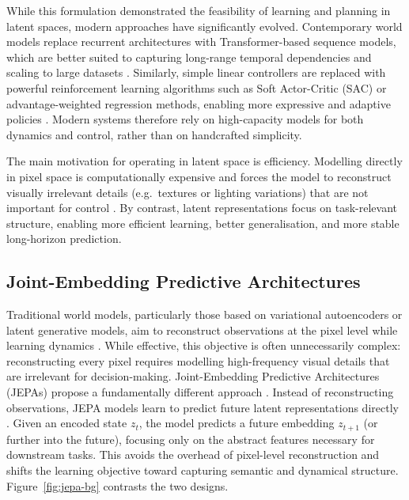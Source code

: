 While this formulation demonstrated the feasibility of learning and planning in latent spaces, modern approaches have significantly evolved. Contemporary world models replace recurrent architectures with Transformer-based sequence models, which are better suited to capturing long-range temporal dependencies and scaling to large datasets \cite{hafner2025dreamerv4}. Similarly, simple linear controllers are replaced with powerful reinforcement learning algorithms such as Soft Actor-Critic (SAC) or advantage-weighted regression methods, enabling more expressive and adaptive policies \cite{haarnoja2018softactorcriticoffpolicymaximum, peng2019advantageweightedregressionsimplescalable,hafner2020dreamer}. Modern systems therefore rely on high-capacity models for both dynamics and control, rather than on handcrafted simplicity.

The main motivation for operating in latent space is efficiency. Modelling directly in pixel space is computationally expensive and forces the model to reconstruct visually irrelevant details (e.g.\ textures or lighting variations) that are not important for control \cite{hafner2019planet,hafner2020dreamer,LeCun2022APT}. By contrast, latent representations focus on task-relevant structure, enabling more efficient learning, better generalisation, and more stable long-horizon prediction.

\subsection{Joint-Embedding Predictive Architectures}
\label{sec:jepa}

Traditional world models, particularly those based on variational autoencoders or latent generative models, aim to reconstruct observations at the pixel level while learning dynamics \cite{kingma2022autoencodingvariationalbayes,ha2018worldmodels,hafner2019planet,hafner2020dreamer}. While effective, this objective is often unnecessarily complex: reconstructing every pixel requires modelling high-frequency visual details that are irrelevant for decision-making.
Joint-Embedding Predictive Architectures (JEPAs) propose a fundamentally different approach \cite{LeCun2022APT}. Instead of reconstructing observations, JEPA models learn to predict future latent representations directly \cite{assran2023selfsupervisedlearningimagesjointembedding}. Given an encoded state $z_t$, the model predicts a future embedding $z_{t+1}$ (or further into the future), focusing only on the abstract features necessary for downstream tasks. This avoids the overhead of pixel-level reconstruction and shifts the learning objective toward capturing semantic and dynamical structure. Figure~\ref{fig:jepa-bg} contrasts the two designs.

